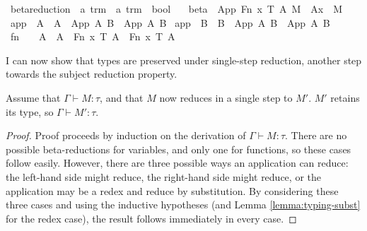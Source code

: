 \begin{implementation}
\isamarkupfalse%
\ beta{\isacharunderscore}reduction\ {\isacharcolon}{\isacharcolon}\ {\isachardoublequoteopen}{\isacharprime}a\ trm\ {\isasymRightarrow}\ {\isacharprime}a\ trm\ {\isasymRightarrow}\ bool{\isachardoublequoteclose}\ \isanewline
\ \ beta{\isacharcolon}\ \ {\isachardoublequoteopen}{\isacharparenleft}App\ {\isacharparenleft}Fn\ x\ T\ A{\isacharparenright}\ M{\isacharparenright}\ {\isasymrightarrow}{\isasymbeta}\ {\isacharparenleft}A{\isacharbrackleft}x\ {\isacharcolon}{\isacharcolon}{\isacharequal}\ M{\isacharbrackright}{\isacharparenright}{\isachardoublequoteclose}\isanewline
{\isacharbar}\ app{}{\isacharcolon}\ \ {\isachardoublequoteopen}A\ {\isasymrightarrow}{\isasymbeta}\ A{\isacharprime}\ {\isasymLongrightarrow}\ {\isacharparenleft}App\ A\ B{\isacharparenright}\ {\isasymrightarrow}{\isasymbeta}\ {\isacharparenleft}App\ A{\isacharprime}\ B{\isacharparenright}{\isachardoublequoteclose}\isanewline
{\isacharbar}\ app{}{\isacharcolon}\ \ {\isachardoublequoteopen}B\ {\isasymrightarrow}{\isasymbeta}\ B{\isacharprime}\ {\isasymLongrightarrow}\ {\isacharparenleft}App\ A\ B{\isacharparenright}\ {\isasymrightarrow}{\isasymbeta}\ {\isacharparenleft}App\ A\ B{\isacharprime}{\isacharparenright}{\isachardoublequoteclose}\isanewline
{\isacharbar}\ fn{\isacharcolon}\ \ \ \ {\isachardoublequoteopen}A\ {\isasymrightarrow}{\isasymbeta}\ A{\isacharprime}\ {\isasymLongrightarrow}\ {\isacharparenleft}Fn\ x\ T\ A{\isacharparenright}\ {\isasymrightarrow}{\isasymbeta}\ {\isacharparenleft}Fn\ x\ T\ A{\isacharprime}{\isacharparenright}{\isachardoublequoteclose}\isanewline
\end{implementation}

I can now show that types are preserved under single-step reduction, another step towards the subject reduction property.
\begin{lemma}
\label{lemma:preservation'}
Assume that \(\Gamma \vdash M : \tau\), and that \(M\) now reduces in a single step to \(M'\).
\(M'\) retains its type, so \(\Gamma \vdash M' : \tau\).
\end{lemma}
\begin{proof}
Proof proceeds by induction on the derivation of \(\Gamma \vdash M : \tau\).
There are no possible beta-reductions for variables, and only one for functions, so these cases follow easily.
However, there are three possible ways an application can reduce: the left-hand side might reduce, the right-hand side might reduce, or the application may be a redex and reduce by substitution.
By considering these three cases and using the inductive hypotheses (and Lemma \ref{lemma:typing-subst} for the redex case), the result follows immediately in every case.
\end{proof}

